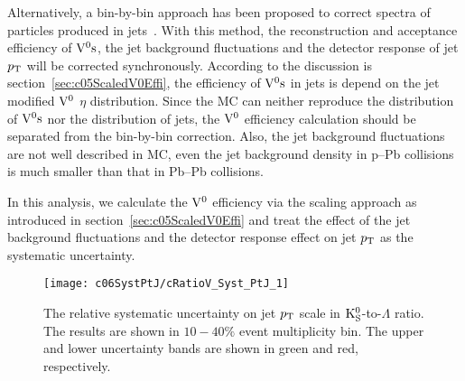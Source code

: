 Alternatively, a bin-by-bin  approach has been proposed to correct spectra of
particles produced in jets~\cite{Ali2012:ana067}.
With this method, the reconstruction and acceptance efficiency of ${\rm V}^{0}{\rm s}$,
the jet background fluctuations and the detector response of jet $p_{\rm T}$ will
be corrected synchronously.
According to the discussion is section~\ref{sec:c05ScaledV0Effi},
the efficiency of ${\rm V}^{0}{\rm s}$ in jets is depend on the jet
modified ${\rm V}^{0}$ $\eta$ distribution.
Since the MC can neither reproduce the distribution of ${\rm V}^{0}{\rm s}$ nor the
distribution of jets,
the ${\rm V}^{0}$ efficiency calculation should be separated from the
bin-by-bin correction.
Also, the jet background fluctuations are not well described in MC,
even the jet background density in p--Pb collisions is much smaller than
that in Pb--Pb collisions.

In this analysis, we calculate the ${\rm V}^{0}$ efficiency via the scaling
approach as introduced in section~\ref{sec:c05ScaledV0Effi} and treat the
effect of the jet background fluctuations and the detector response effect
on jet $p_{\rm T}$ as the systematic uncertainty.

\begin{figure}[htb]
\begin{center}
\texttt{[image: c06SystPtJ/cRatioV\_Syst\_PtJ\_1]}
\caption{The relative systematic uncertainty on jet $p_{\rm T}$ scale
         in  ${\rm K}_{\rm S}^{0}$-to-$\Lambda$ ratio.
         The results are shown in $10-40\%$ event multiplicity bin.
         The upper and lower uncertainty bands are shown in green and red,
         respectively.}
\label{fig:c06SystRatioVPtJ}
\end{center}
\end{figure}

